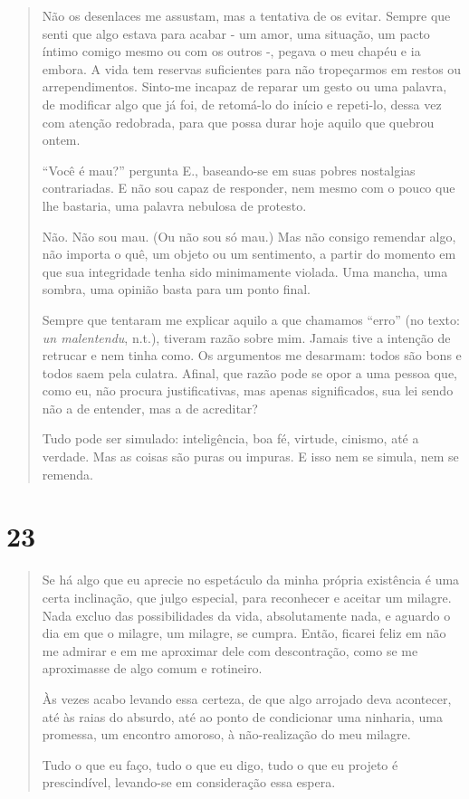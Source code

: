 \begin{quote}
Não os desenlaces me assustam, mas a tentativa de os evitar. Sempre que
senti que algo estava para acabar - um amor, uma situação, um pacto
íntimo comigo mesmo ou com os outros -, pegava o meu chapéu e ia embora.
A vida tem reservas suficientes para não tropeçarmos em restos ou
arrependimentos. Sinto-me incapaz de reparar um gesto ou uma palavra, de
modificar algo que já foi, de retomá-lo do início e repeti-lo, dessa vez
com atenção redobrada, para que possa durar hoje aquilo que quebrou
ontem.

``Você é mau?'' pergunta E., baseando-se em suas pobres nostalgias
contrariadas. E não sou capaz de responder, nem mesmo com o pouco que
lhe bastaria, uma palavra nebulosa de protesto.

Não. Não sou mau. (Ou não sou só mau.) Mas não consigo remendar algo,
não importa o quê, um objeto ou um sentimento, a partir do momento em
que sua integridade tenha sido minimamente violada. Uma mancha, uma
sombra, uma opinião basta para um ponto final.

Sempre que tentaram me explicar aquilo a que chamamos ``erro'' (no
texto: \emph{un malentendu}, n.t.), tiveram razão sobre mim. Jamais tive
a intenção de retrucar e nem tinha como. Os argumentos me desarmam:
todos são bons e todos saem pela culatra. Afinal, que razão pode se opor
a uma pessoa que, como eu, não procura justificativas, mas apenas
significados, sua lei sendo não a de entender, mas a de acreditar?

Tudo pode ser simulado: inteligência, boa fé, virtude, cinismo, até a
verdade. Mas as coisas são puras ou impuras. E isso nem se simula, nem
se remenda.
\end{quote}

\section{23}\label{section-22}

\begin{quote}
Se há algo que eu aprecie no espetáculo da minha própria existência é
uma certa inclinação, que julgo especial, para reconhecer e aceitar um
milagre. Nada excluo das possibilidades da vida, absolutamente nada, e
aguardo o dia em que o milagre, um milagre, se cumpra. Então, ficarei
feliz em não me admirar e em me aproximar dele com descontração, como se
me aproximasse de algo comum e rotineiro.

Às vezes acabo levando essa certeza, de que algo arrojado deva
acontecer, até às raias do absurdo, até ao ponto de condicionar uma
ninharia, uma promessa, um encontro amoroso, à não-realização do meu
milagre.

Tudo o que eu faço, tudo o que eu digo, tudo o que eu projeto é
prescindível, levando-se em consideração essa espera.
\end{quote}

